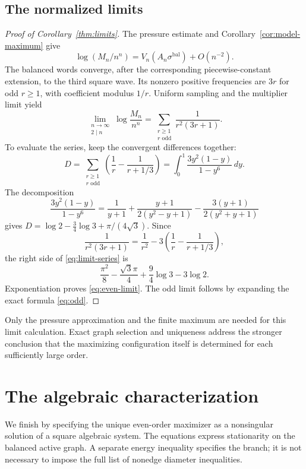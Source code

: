 \documentclass[11pt,reqno]{amsart}
\numberwithin{equation}{section}
\theoremstyle{definition}
\theoremstyle{remark}
\newcommand{\bal}{\mathrm{bal}}
\begin{document}
\subsection{The normalized limits}
\begin{proof}[Proof of Corollary~\ref{thm:limits}]
The pressure estimate and Corollary~\ref{cor:model-maximum} give
\[
 \log(M_n/n^n)=V_n(A_n\sigma^{\bal})+O(n^{-2}).
\]
The balanced words converge, after the corresponding piecewise-constant extension, to the third square wave. Its nonzero positive frequencies are $3r$ for odd $r\ge1$, with coefficient modulus $1/r$. Uniform sampling and the multiplier limit yield
\begin{equation}\label{eq:limit-series}
 \lim_{\substack{n\to\infty\\2\mid n}}\log\frac{M_n}{n^n}
 =\sum_{\substack{r\ge1\\r\text{ odd}}}\frac1{r^2(3r+1)}.
\end{equation}
To evaluate the series, keep the convergent differences together:
\[
 D=\sum_{\substack{r\ge1\\r\text{ odd}}}
       \left(\frac1r-\frac1{r+1/3}\right)
   =\int_0^1\frac{3y^2(1-y)}{1-y^6}\,dy.
\]
The decomposition
\[
 \frac{3y^2(1-y)}{1-y^6}
 =\frac1{y+1}+\frac{y+1}{2(y^2-y+1)}
                 -\frac{3(y+1)}{2(y^2+y+1)}
\]
gives $D=\log2-\tfrac34\log3+\pi/(4\sqrt3)$. Since
\[
 \frac1{r^2(3r+1)}=\frac1{r^2}
                    -3\left(\frac1r-\frac1{r+1/3}\right),
\]
the right side of \eqref{eq:limit-series} is
\[
 \frac{\pi^2}{8}-\frac{\sqrt3\pi}{4}+\frac94\log3-3\log2.
\]
Exponentiation proves \eqref{eq:even-limit}. The odd limit follows by expanding the exact formula \eqref{eq:odd}.
\end{proof}

Only the pressure approximation and the finite maximum are needed for this limit calculation. Exact graph selection and uniqueness address the stronger conclusion that the maximizing configuration itself is determined for each sufficiently large order.


\section{The algebraic characterization}\label{sec:algebraic}
We finish by specifying the unique even-order maximizer as a nonsingular solution of a square algebraic system. The equations express stationarity on the balanced active graph. A separate energy inequality specifies the branch; it is not necessary to impose the full list of nonedge diameter inequalities.
\end{document}

